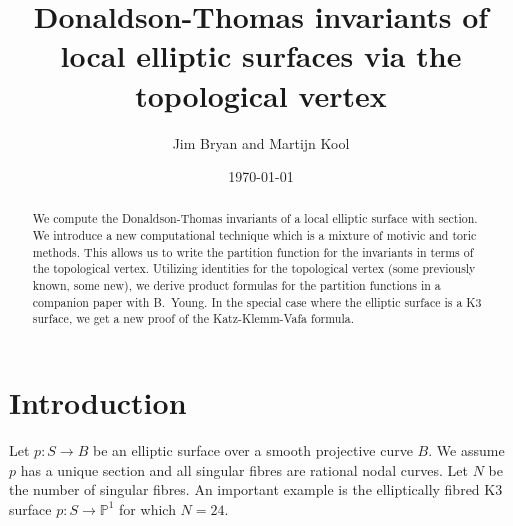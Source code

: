 \documentclass{amsart}
\title{Donaldson-Thomas invariants of local elliptic surfaces via the topological vertex}
\author{Jim Bryan and Martijn Kool}
\date{\today}
\theoremstyle{definition}
\newcommand{\PP} {\mathbb{P}}
\begin{document}
\begin{abstract}

We compute the Donaldson-Thomas invariants of a local elliptic surface
with section. We introduce a new computational technique which is a
mixture of motivic and toric methods. This allows us to write the
partition function for the invariants in terms of the topological
vertex. Utilizing identities for the topological vertex (some
previously known, some new), we derive product formulas for the
partition functions in a companion paper with B.~Young. In the special case where the elliptic surface is
a K3 surface, we get a new proof of the Katz-Klemm-Vafa formula.
\end{abstract}

\maketitle 





\section{Introduction}

Let $p : S \rightarrow B$ be an elliptic surface over a smooth projective curve $B$. We assume $p$ has a unique section  and all singular fibres are rational nodal curves. Let $N$ be the number of singular fibres. An important example is the elliptically fibred K3 surface $p : S \rightarrow \PP^1$ for which $N=24$.
\end{document}
